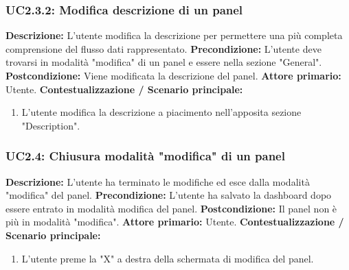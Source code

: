                 \subsubsection{UC2.3.2: Modifica descrizione di un panel}
                    \textbf{Descrizione:} L’utente modifica la descrizione per permettere una più completa comprensione del flusso dati rappresentato.
                    \newline
                    \textbf{Precondizione:} L'utente deve trovarsi in modalità "modifica" di un panel e essere nella sezione "General".
                    \newline
                    \textbf{Postcondizione:} Viene modificata la descrizione del panel.
                    \newline
                    \textbf{Attore primario:} Utente.
                    \newline
                    \textbf{Contestualizzazione / Scenario principale:} \begin{enumerate}
                        \item L’utente modifica la descrizione a piacimento nell'apposita sezione "Description".
                    \end{enumerate}
                    
                \subsubsection{UC2.4: Chiusura modalità "modifica" di un panel}
                    \textbf{Descrizione:} L’utente ha terminato le modifiche ed esce dalla modalità "modifica" del panel.
                    \newline
                    \textbf{Precondizione:} L'utente ha salvato la dashboard dopo essere entrato in modalità modifica del panel.
                    \newline
                    \textbf{Postcondizione:} Il panel non è più in modalità "modifica".
                    \newline
                    \textbf{Attore primario:} Utente.
                    \newline
                    \textbf{Contestualizzazione / Scenario principale:} \begin{enumerate}
                        \item L’utente preme la "X" a destra della schermata di modifica del panel.
                    \end{enumerate}
                
